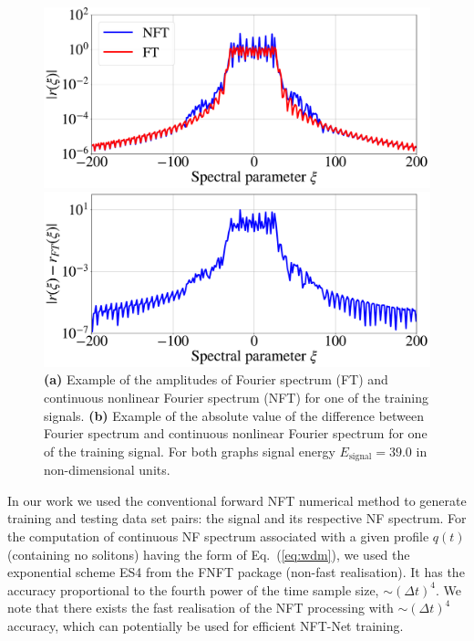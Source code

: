 \begin{figure}[ht]
\centering
\begin{minipage}{.49\textwidth}
  \centering
  \includegraphics[width=1.\linewidth]{images/nn_nft/scirep_ft_vs_nft_actual.pdf}
\end{minipage}%
\begin{minipage}{.49\textwidth}
  \centering
  \includegraphics[width=1.\linewidth]{images/nn_nft/scirep_ft_vs_nft.pdf}
\end{minipage}
\caption{\textbf{(a)} Example of the amplitudes of Fourier spectrum (FT) and continuous nonlinear Fourier spectrum (NFT) for one of the training signals. \textbf{(b)} Example of the absolute value of the difference between Fourier spectrum and continuous nonlinear Fourier spectrum for one of the training signal. For both graphs signal energy $E_{\text{signal}} = 39.0$ in non-dimensional units.}
\label{fig:nft_and_ft}
\end{figure}

In our work we used the conventional forward NFT numerical method to generate training and testing data set pairs: the signal and its respective NF spectrum. %
For the computation of continuous NF spectrum associated with a given profile $q(t)$ (containing no solitons) having the form of Eq.~(\ref{eq:wdm}), we used the exponential scheme ES4 from the FNFT package\cite{FNFT2018} (non-fast realisation). It has the accuracy proportional to the fourth power of the time sample size, $\sim (\Delta t)^4$. We note that there exists the fast realisation of the NFT processing with $\sim (\Delta t)^4$ accuracy\cite{medvedev2020exponential}, which can potentially be used for efficient NFT-Net training.



